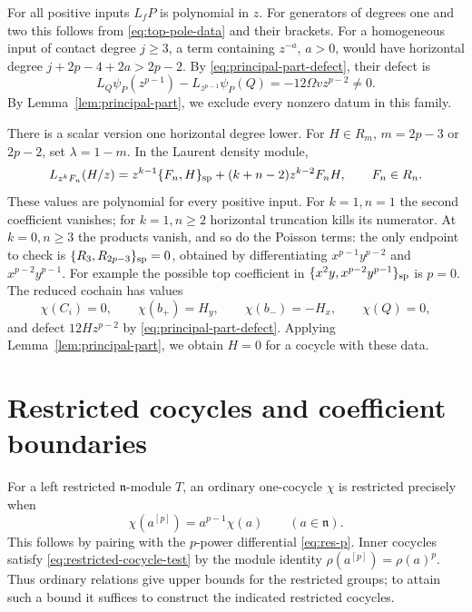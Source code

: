 \documentclass[11pt]{article}
\theoremstyle{plain}
\theoremstyle{definition}
\theoremstyle{remark}
\numberwithin{equation}{section}
\begin{document}
For all positive inputs \(L_fP\) is polynomial in \(z\).
For generators of degrees one and two this follows from
\eqref{eq:top-pole-data} and their brackets. For a homogeneous input
of contact degree \(j\ge3\), a term containing \(z^{-a}\), \(a>0\),
would have horizontal degree \(j+2p-4+2a>2p-2\).
By \eqref{eq:principal-part-defect}, their defect is
\begin{equation}\label{eq:top-pole-defect}
 L_Q\psi_P(z^{p-1})-L_{z^{p-1}}\psi_P(Q)
       =-12\Omega v z^{p-2}\ne0.
\end{equation}
By Lemma~\ref{lem:principal-part}, we exclude every nonzero datum in this family.

There is a scalar version one horizontal degree lower.
For \(H\in R_m\), \(m=2p-3\) or \(2p-2\), set
\(\lambda=1-m\). In the Laurent density module,
\begin{equation}\label{eq:scalar-pole-data}
 L_{z^kF_n}(H/z)
   =z^{k-1}\{F_n,H\}_{\rm sp}
       +(k+n-2)z^{k-2}F_nH,\qquad F_n\in R_n .
\end{equation}
These values are polynomial for every positive input.
For \(k=1,n=1\) the second coefficient vanishes; for \(k=1,n\ge2\)
horizontal truncation kills its numerator. At \(k=0,n\ge3\)
the products vanish, and so do the Poisson terms:
the only endpoint to check is
\(\{R_3,R_{2p-3}\}_{\rm sp}=0\), obtained by differentiating
\(x^{p-1}y^{p-2}\) and \(x^{p-2}y^{p-1}\).
For example the possible top coefficient in
\(\{x^2y,x^{p-2}y^{p-1}\}_{\rm sp}\) is \(p=0\).
The reduced cochain has values
\[
 \chi(C_i)=0,\qquad \chi(b_+)=H_y,\qquad
 \chi(b_-)=-H_x,\qquad \chi(Q)=0,
\]
and defect \(12Hz^{p-2}\) by \eqref{eq:principal-part-defect}.
Applying Lemma~\ref{lem:principal-part}, we obtain \(H=0\) for a cocycle with these data.


\section{Restricted cocycles and coefficient boundaries}\label{sec:restricted}

For a left restricted \(\mathfrak n\)-module \(T\), an ordinary
one-cocycle \(\chi\) is restricted precisely when
\begin{equation}\label{eq:restricted-cocycle-test}
 \chi(a^{[p]})=a^{p-1}\chi(a)\qquad(a\in\mathfrak n).
\end{equation}
This follows by pairing with the \(p\)-power differential
\eqref{eq:res-p}. Inner cocycles satisfy
\eqref{eq:restricted-cocycle-test} by the module identity
\(\rho(a^{[p]})=\rho(a)^p\).
Thus ordinary relations give upper bounds for the restricted groups;
to attain such a bound it suffices to construct the indicated
restricted cocycles.
\end{document}
